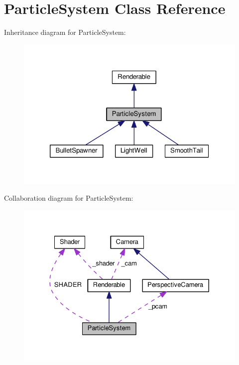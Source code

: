 \hypertarget{class_particle_system}{}\section{Particle\+System Class Reference}
\label{class_particle_system}


Inheritance diagram for Particle\+System\+:\nopagebreak
\begin{figure}[H]
\begin{center}
\leavevmode
\includegraphics[width=320pt]{class_particle_system__inherit__graph}
\end{center}
\end{figure}


Collaboration diagram for Particle\+System\+:\nopagebreak
\begin{figure}[H]
\begin{center}
\leavevmode
\includegraphics[width=327pt]{class_particle_system__coll__graph}
\end{center}
\end{figure}
